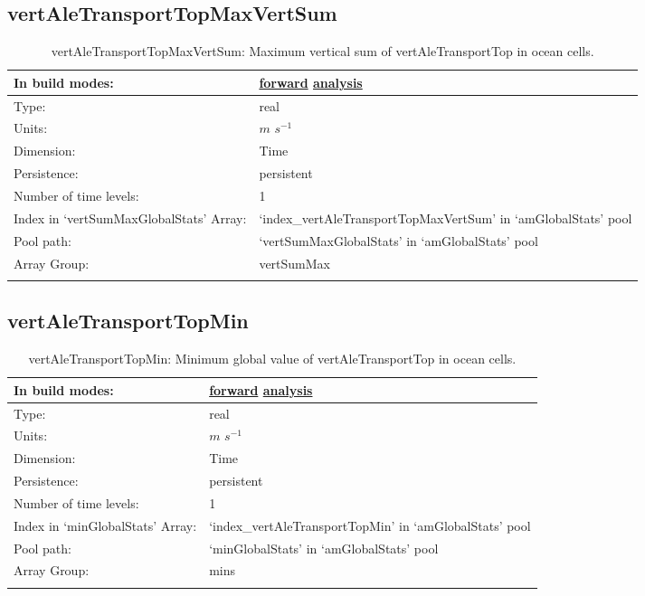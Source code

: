 \subsection[vertAleTransportTopMaxVertSum]{vertAleTransportTopMaxVertSum}
\label{subsec:var_sec_amGlobalStats_vertAleTransportTopMaxVertSum}
\begin{center}
\begin{longtable}{| p{2.0in} | p{4.0in} |}
        \hline 
        In build modes: & \hyperref[subsec:forward_var_tab_amGlobalStats]{forward} \hyperref[subsec:analysis_var_tab_amGlobalStats]{analysis} \\
        \hline 
        Type: & real \\
        \hline 
        Units: & $m$ $s^{-1}$ \\
        \hline 
        Dimension: & Time \\
        \hline 
        Persistence: & persistent \\
        \hline 
        Number of time levels: & 1 \\
        \hline 
		 Index in `vertSumMaxGlobalStats' Array: & `index\_vertAleTransportTopMaxVertSum' in `amGlobalStats' pool \\
		 \hline 
            Pool path: & `vertSumMaxGlobalStats' in `amGlobalStats' pool \\
		 \hline 
		 Array Group: & vertSumMax \\
		 \hline 
    \caption{vertAleTransportTopMaxVertSum: Maximum vertical sum of vertAleTransportTop in ocean cells.}
\end{longtable}
\end{center}
\subsection[vertAleTransportTopMin]{vertAleTransportTopMin}
\label{subsec:var_sec_amGlobalStats_vertAleTransportTopMin}
\begin{center}
\begin{longtable}{| p{2.0in} | p{4.0in} |}
        \hline 
        In build modes: & \hyperref[subsec:forward_var_tab_amGlobalStats]{forward} \hyperref[subsec:analysis_var_tab_amGlobalStats]{analysis} \\
        \hline 
        Type: & real \\
        \hline 
        Units: & $m$ $s^{-1}$ \\
        \hline 
        Dimension: & Time \\
        \hline 
        Persistence: & persistent \\
        \hline 
        Number of time levels: & 1 \\
        \hline 
		 Index in `minGlobalStats' Array: & `index\_vertAleTransportTopMin' in `amGlobalStats' pool \\
		 \hline 
            Pool path: & `minGlobalStats' in `amGlobalStats' pool \\
		 \hline 
		 Array Group: & mins \\
		 \hline 
    \caption{vertAleTransportTopMin: Minimum global value of vertAleTransportTop in ocean cells.}
\end{longtable}
\end{center}
